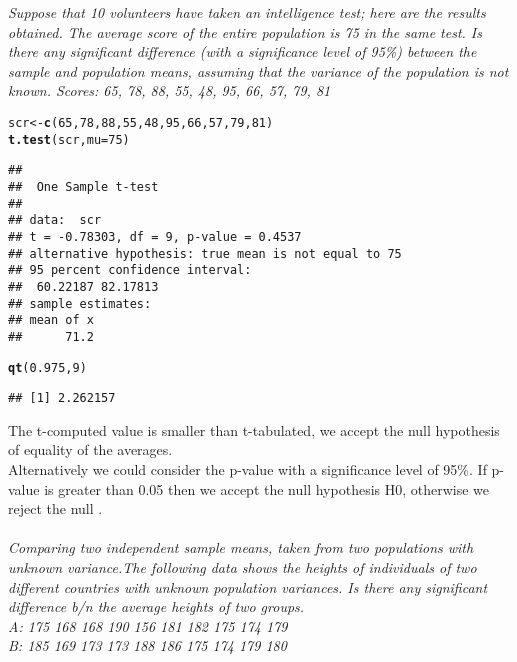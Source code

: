 \documentclass{article}\usepackage[]{graphicx}\usepackage[]{xcolor}
\makeatletter
\newcommand{\hlnum}[1]{\textcolor[rgb]{0.686,0.059,0.569}{#1}}%
\newcommand{\hldef}[1]{\textcolor[rgb]{0.345,0.345,0.345}{#1}}%
\newcommand{\hlkwb}[1]{\textcolor[rgb]{0.69,0.353,0.396}{#1}}%
\newcommand{\hlkwc}[1]{\textcolor[rgb]{0.333,0.667,0.333}{#1}}%
\newcommand{\hlkwd}[1]{\textcolor[rgb]{0.737,0.353,0.396}{\textbf{#1}}}%
\newenvironment{kframe}{%
 \def\at@end@of@kframe{}%
 \ifinner\ifhmode%
  \def\at@end@of@kframe{\end{minipage}}%
  \begin{minipage}{\columnwidth}%
 \fi\fi%
 \def\FrameCommand##1{\hskip\@totalleftmargin \hskip-\fboxsep
 \colorbox{shadecolor}{##1}\hskip-\fboxsep
     \hskip-\linewidth \hskip-\@totalleftmargin \hskip\columnwidth}%
 \MakeFramed {\advance\hsize-\width
   \@totalleftmargin\z@ \linewidth\hsize
   \@setminipage}}%
 {\par\unskip\endMakeFramed%
 \at@end@of@kframe}
\newenvironment{knitrout}{}{} %
\makeatother
\begin{document}
\emph{Suppose that 10 volunteers have taken an intelligence test; here are the
results obtained. The average score of the entire population is 75 in the same test. Is
there any significant difference (with a significance level of 95\%) between the sample
and population means, assuming that the variance of the population is not known.
Scores: 65, 78, 88, 55, 48, 95, 66, 57, 79, 81}
\begin{knitrout}
\color{fgcolor}\begin{kframe}
\begin{alltt}
\hldef{scr} \hlkwb{<-} \hlkwd{c}\hldef{(}\hlnum{65}\hldef{,} \hlnum{78}\hldef{,} \hlnum{88}\hldef{,} \hlnum{55}\hldef{,} \hlnum{48}\hldef{,} \hlnum{95}\hldef{,} \hlnum{66}\hldef{,} \hlnum{57}\hldef{,} \hlnum{79}\hldef{,} \hlnum{81}\hldef{)}
\hlkwd{t.test}\hldef{(scr,} \hlkwc{mu}\hldef{=}\hlnum{75}\hldef{)}
\end{alltt}
\begin{verbatim}
## 
## 	One Sample t-test
## 
## data:  scr
## t = -0.78303, df = 9, p-value = 0.4537
## alternative hypothesis: true mean is not equal to 75
## 95 percent confidence interval:
##  60.22187 82.17813
## sample estimates:
## mean of x 
##      71.2
\end{verbatim}
\begin{alltt}
\hlkwd{qt}\hldef{(}\hlnum{0.975}\hldef{,} \hlnum{9}\hldef{)}
\end{alltt}
\begin{verbatim}
## [1] 2.262157
\end{verbatim}
\end{kframe}
\end{knitrout}
The t-computed value is smaller than t-tabulated, we accept the null
hypothesis of equality of the averages.\\
Alternatively we could consider the p-value with a significance level of
95\%. If p-value is greater than 0.05 then we accept the null hypothesis
H0, otherwise we reject the null .
\\
\\
\emph{Comparing two independent sample means, taken from two populations
with unknown variance.The following data shows the heights of individuals of two
different countries with unknown population variances. Is there any significant
difference b/n the average heights of two groups.\\
A: 175 168 168 190 156 181 182 175 174 179\\
B: 185 169 173 173 188 186 175 174 179 180\\}
\end{document}
